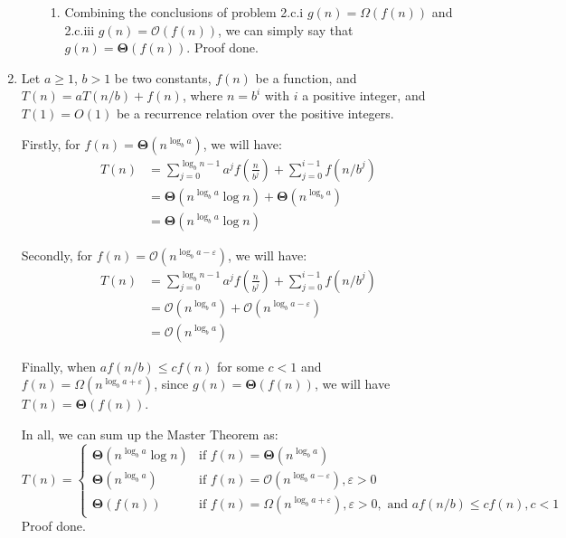 \documentclass[12pt, a4paper]{article}
\begin{document}
\begin{enumerate}
\begin{enumerate}
\begin{enumerate}
            \item Combining the conclusions of problem 2.c.i $g(n) = \Omega(f(n))$ and 2.c.iii $g(n) = \mathcal{O}(f(n))$, 
                  we can simply say that $g(n) = \boldsymbol{\Theta}(f(n))$. Proof done.
        \end{enumerate}
    \end{enumerate}

    \item Let $a \geq 1$, $b > 1$ be two constants, $f(n)$ be a function, and $T(n) = aT(n/b) + f(n)$, where $n = b^i$ with $i$ a positive integer, 
          and $T(1) = O(1)$ be a recurrence relation over the positive integers.

          Firstly, for $f(n) = \boldsymbol{\Theta}(n^{\log_b a})$, we will have:
          \begin{align*}
              T(n) &= \sum_{j=0}^{\log_b n - 1} a^j f(\frac{n}{b^j}) + \sum_{j=0}^{i-1}f(n/b^j)\\
                   &= \boldsymbol{\Theta}(n^{\log_b a}\log n) + \boldsymbol{\Theta}(n^{\log_b a})\\
                   &= \boldsymbol{\Theta}(n^{\log_b a}\log n)
          \end{align*}

          Secondly, for $f(n) = \mathcal{O}(n^{\log_b a - \varepsilon})$, we will have:
          \begin{align*}
              T(n) &= \sum_{j=0}^{\log_b n - 1} a^j f(\frac{n}{b^j}) + \sum_{j=0}^{i-1}f(n/b^j)\\
                   &= \mathcal{O}(n^{\log_b a}) + \mathcal{O}(n^{\log_b a - \varepsilon})\\
                   &= \mathcal{O}(n^{\log_b a})
          \end{align*}

          Finally, when $af(n/b) \leq cf(n)$ for some $c < 1$ and $f(n) = \Omega(n^{\log_b a + \varepsilon})$, 
          since $g(n) = \boldsymbol{\Theta}(f(n))$, we will have $T(n) = \boldsymbol{\Theta}(f(n))$.

          In all, we can sum up the Master Theorem as:
          $$T(n) = 
          \begin{cases}
              \boldsymbol{\Theta}(n^{\log_b a}\log n) & \text{if } f(n) = \boldsymbol{\Theta}(n^{\log_b a})\\
              \boldsymbol{\Theta}(n^{\log_b a}) & \text{if } f(n) = \mathcal{O}(n^{\log_b a - \varepsilon}), \varepsilon > 0\\
              \boldsymbol{\Theta}(f(n)) & \text{if } f(n) = \Omega(n^{\log_b a + \varepsilon}), \varepsilon > 0, \text{ and } af(n/b) \leq cf(n), c < 1
          \end{cases}
          $$
          Proof done.

\end{enumerate}
\end{document}
